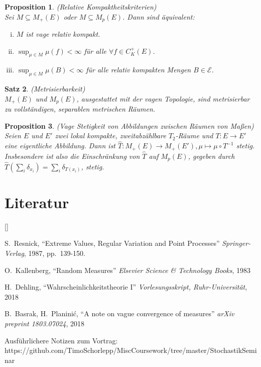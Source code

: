 \documentclass[twoside]{article}
\newcounter{lecnum}
\def\beginrefs{\begin{list}%
        {[\arabic{equation}]}{\usecounter{equation}
         \setlength{\leftmargin}{2.0truecm}\setlength{\labelsep}{0.4truecm}%
         \setlength{\labelwidth}{1.6truecm}}}
\def\endrefs{\end{list}}
\def\bibentry#1{\item[\hbox{[#1]}]}
\newtheorem{theorem}{Satz}[lecnum]
\newtheorem{proposition}[theorem]{Proposition}
\theoremstyle{definition}
\begin{document}
\begin{proposition}(Relative Kompaktheitskriterien)\\
Sei $M \subseteq M_+(E)$ oder $M \subseteq M_p(E)$. Dann sind äquivalent:
\begin{enumerate}[(i)]
\item $M$ ist vage relativ kompakt.
\item $\sup_{\mu \in M} \mu(f) < \infty$  für alle $\forall f \in C_K^+(E)$.
\item $\sup_{\mu \in M} \mu(B) < \infty$ für alle relativ kompakten Mengen $B \in \mathcal{E}$.
\end{enumerate}
\end{proposition}

\begin{theorem} (Metrisierbarkeit)\\
$M_+(E)$ und $M_p(E)$, ausgestattet mit der vagen Topologie, sind metrisierbar zu vollständigen, separablen metrischen Räumen.
\end{theorem}

\begin{proposition} (Vage Stetigkeit von Abbildungen zwischen Räumen von Maßen)\\
Seien $E$ und $E'$ zwei lokal kompakte, zweitabzählbare $T_2$-Räume und $T:E \to E'$ eine eigentliche Abbildung. Dann ist $\hat{T}:M_+(E) \to M_+(E'), \mu \mapsto \mu \circ T^{-1}$ stetig. Insbesondere ist also die Einschränkung von $\hat{T}$ auf $M_p(E)$, gegeben durch $\hat{T}\left( \sum_i \delta_{x_i} \right) = \sum_i \delta_{T(x_i)}$, stetig.
\end{proposition}

\section*{Literatur}
\beginrefs
\bibentry{1}{\sc S.~Resnick}, 
``Extreme Values, Regular Variation and Point Processes''
{\it Springer-Verlag},
1987, pp.~139-150.
\bibentry{2}{\sc O.~Kallenberg}, 
``Random Measures''
{\it Elsevier Science \& Technology Books},
1983
\bibentry{3}{\sc H.~Dehling}, 
``Wahrscheinlichkeitstheorie I''
{\it Vorlesungsskript, Ruhr-Universität},
2018
\bibentry{4}{\sc B.~Basrak, H.~Planinić}, 
``A note on vague convergence of measures''
{\it arXiv preprint 1803.07024},
2018
\bibentry{5}
Ausführlichere Notizen zum Vortrag:\\https://github.com/TimoSchorlepp/MiscCoursework/tree/master/StochastikSeminar
\endrefs
\end{document}
